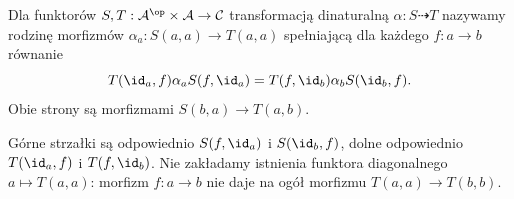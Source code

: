 \begin{definicja}\label{cat:def:dinatural}
Dla funktorów $S,T:\mathcal A^{\op}\times\mathcal A\to\mathcal C$ transformacją dinaturalną $\alpha:S\dashrightarrow T$ nazywamy rodzinę morfizmów $\alpha_a:S(a,a)\to T(a,a)$ spełniającą dla każdego $f:a\to b$ równanie
\begin{equation}\label{cat:eq:dinatural}
 T(\id_a,f)\alpha_a S(f,\id_a)
 =T(f,\id_b)\alpha_b S(\id_b,f).
\end{equation}
Obie strony są morfizmami $S(b,a)\to T(a,b)$.
\end{definicja}
\begin{center}
\end{center}
Górne strzałki są odpowiednio $S(f,\id_a)$ i $S(\id_b,f)$, dolne odpowiednio $T(\id_a,f)$ i $T(f,\id_b)$. Nie zakładamy istnienia funktora diagonalnego $a\mapsto T(a,a)$: morfizm $f:a\to b$ nie daje na ogół morfizmu $T(a,a)\to T(b,b)$.

